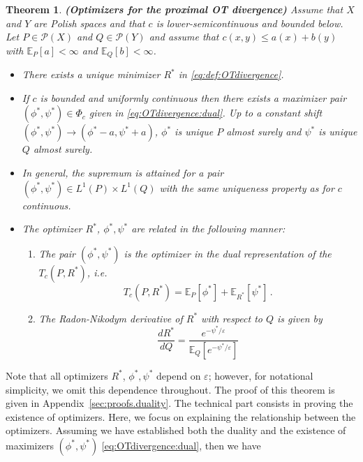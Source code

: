 \documentclass{amsart}
\newtheorem{theorem}{Theorem}[section]
\theoremstyle{definition}
\theoremstyle{remark}
\numberwithin{equation}{section}
\begin{document}
\begin{theorem}{\bf(Optimizers for the proximal OT divergence)} \label{thm:duality.optimizers} 
Assume that $X$ and $Y$ are Polish spaces and that $c$ is lower-semicontinuous and bounded below.  
Let $P\in \mathcal{P}(X)$ and $Q\in \mathcal{P}(Y)$ and assume that $c(x,y)\le a(x)+b(y)$ with $\mathbb{E}_P[a] < \infty$ and $\mathbb{E}_Q[b] < \infty$.

\begin{itemize}
\item[$(a)$] There exists a unique minimizer $R^*$ in  \eqref{eq:def:OTdivergence}.
\item[$(b)$] If $c$ is bounded and uniformly continuous then there exists a maximizer pair $(\phi^*, \psi^*)\in\Phi_c$ given in \eqref{eq:OTdivergence:dual}.  
Up to a constant shift $(\phi^*, \psi^*) \to (\phi^*-a, \psi^*+a)$, 
$\phi^*$ is unique $P$ almost surely and $\psi^*$ is unique $Q$ almost surely. 
\item[$(c)$] In general, the supremum is attained for a pair $(\phi^*, \psi^*) \in L^1(P)\times L^1(Q)$ with the same uniqueness property as for $c$ continuous.  
\item[$(d)$]  The optimizer $R^*$, $\phi^*, \psi^*$ are 
 related in the following manner:
\begin{enumerate}
\item The pair $(\phi^*,\psi^*)$ is the optimizer in the dual representation of the $T_c(P,R^*)$, i.e. 
\begin{equation}\label{eq:optimalR*1}
T_c(P,R^*)= \mathbb{E}_P[\phi^*] + \mathbb{E}_{R^*}[\psi^*]  \,.
\end{equation}
\item The Radon-Nikodym  derivative of $R^*$ with respect to $Q$ is given by 
\begin{equation}\label{eq:optimalR*2}
\frac{dR^*}{dQ} =  \frac{e^{- \psi^*/\varepsilon}}{\mathbb{E}_Q[e^{-\psi^*/\varepsilon}]} 
\end{equation}
\end{enumerate}
\end{itemize}
\end{theorem}
Note that all optimizers $R^*$, $\phi^*, \psi^*$ depend on $\varepsilon$; however, for notational simplicity, we omit this dependence throughout. The proof of this theorem is given in Appendix~\ref{sec:proofs.duality}.  The technical part consists in proving the existence of optimizers.  Here, we focus on explaining the relationship between the optimizers. Assuming we have established both the duality and the existence of maximizers  $(\phi^*,\psi^*)$  \eqref{eq:OTdivergence:dual}, then we have 
\end{document}
